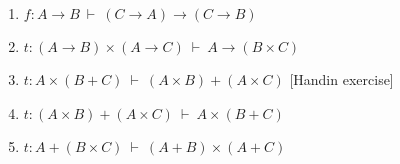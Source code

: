 \documentclass[11pt]{report}
\begin{document}
\begin{enumerate}
\begin{enumerate}
			{\bf Solution:}
				\begin{center}
					\footnotesize{$\begin{array}{c}
						\infer[\sumElim]{\sumElim \ p \ (\lambda x. \ \inl \ (f \ x)) \ (\lambda y. \ \inr \ (g \ y)) \ : \ C + D}
							{p : A + B
							&
							\infer[\lambda,1]{\lambda x. \ \inl \ (f \ x) : A \to C+D}
								{\infer[\inl]{\inl \ (f \ a) : C + D}
									{\infer[\app]{f \ a : C}
										{f : A \to C
										&
										\infer[1]{a : A}
											{}}}}
							&
							\infer[\lambda,2]{\lambda y. \ \inl \ (g \ y) : B \to C+D}
								{\infer[\inr]{\inr \ (g \ b) : C + D}
									{\infer[\app]{g \ b : D}
										{g : B \to D
										&
										\infer[2]{b : B}
											{}}}}}
					\end{array}$}
				\end{center}
			Compare this typing derivation to the natural deduction verifying the sequent: 
			$$A \lor B,\ A \to  C,\ B \to  D \vdash \ C \lor D$$
				\begin{center}
					\footnotesize{$\begin{array}{c}
						\infer[\lor E]{C \lor D}
							{A \lor B
							&
							\infer[\to I,1]{A \to C\lor D}
								{\infer[\lor I]{C \lor D}
									{\infer[\MP]{C}
										{A \to C
										&
										\infer[1]{A}
											{}}}}
							&
							\infer[\to I,2]{B \to C\lor D}
								{\infer[\lor I]{C \lor D}
									{\infer[\MP]{D}
										{B \to D
										&
										\infer[2]{B}
											{}}}}}
					\end{array}$}
				\end{center}		
			The resulting $\lambda$-term (i.e. program) below
			$$\sumElim \ p \ (\lambda x. \ \inl \ (f \ x)) \ (\lambda y. \ \inr \ (g \ y)) \ : \ C + D$$
			is the proof-object witnessing the proof of the sequent.		
		
		\item $f : A \to B \ \vdash \ (C \to A) \to (C \to B)$	
		
		
		\newpage
		\item $t : (A \to B) \times (A \to C) \ \vdash \ A \to (B \times C)$
		
		\newpage
		\item $t : A \times (B + C) \ \vdash \ (A \times B) + (A \times C)$ \hfill [Handin exercise]
		
		\newpage
		\item $t : (A \times B) + (A \times C) \ \vdash \ A \times (B + C)$
		
		\newpage
		\item $t : A + (B \times C) \ \vdash \ (A + B) \times (A + C)$
		

\end{enumerate}
\end{enumerate}
\end{document}
